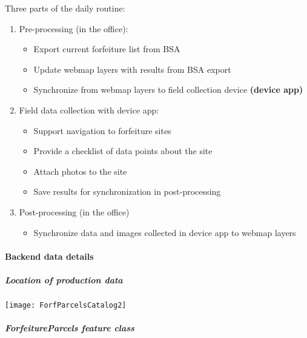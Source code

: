 \documentclass[class=article , crop=false, titlepage, twoside, multi={itemize, figure, verbatim}, float=false]{standalone}
\begin{document}
Three parts of the daily routine:
\begin{enumerate}
\item Pre-processing (in the office):

\begin{itemize}
\item Export current forfeiture list from BSA
\item Update webmap layers with results from BSA export
\item Synchronize from webmap layers to field collection device \textbf{(device app)}
\end{itemize}

\item Field data collection with device app:

\begin{itemize}
\item Support navigation to forfeiture sites
\item Provide a checklist of data points about the site
\item Attach photos to the site
\item Save results for synchronization in post-processing
\end{itemize}

\item Post-processing (in the office)

\begin{itemize}
\item Synchronize data and images collected in device app to webmap layers

\end{itemize}
\end{enumerate}

\paragraph{Backend data details}
\subparagraph{Location of production data}

\begin{center}
    \texttt{[image: ForfParcelsCatalog2]}
    \label{img:forfCat1}
\end{center}

\subparagraph{ForfeitureParcels feature class}

\end{document}
